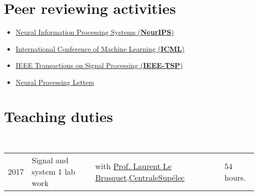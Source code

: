 \documentclass[a4paper,10pt]{article}
\begin{document}


\enlargethispage*{0.9cm}
\setlength{\bibitemsep}{1.8pt}
\begin{publications}
\end{publications}
%
%
%
%
%
\section{Peer reviewing activities}
\begin{itemize}\parskip=0cm
  \item \href{https://nips.cc/}{Neural Information Processing Systems (\textbf{NeurIPS})}
  \item \href{https://icml.cc}{International Conference of Machine Learning (\textbf{ICML})}
  \item \href{http://ieeexplore.ieee.org/xpl/RecentIssue.jsp?punumber=78}{IEEE Transactions on Signal Processing (\textbf{IEEE-TSP})}
  \item \href{http://www.springer.com/computer/ai/journal/11063}{Neural Processing Letters}
\end{itemize}
%
%
%
%
%
\section{Teaching duties}
~\begin{tabular}{llll}
2017 & Signal and system 1 lab work & with \href{mailto:Laurent.Lebrusquet@centralesupelec.fr}{Prof. Laurent Le Brusquet},\href{http://www.centralesupelec.fr}{CentraleSup\'elec} & 54 hours.
\end{tabular}
%
%
%
%
%
\end{document}
